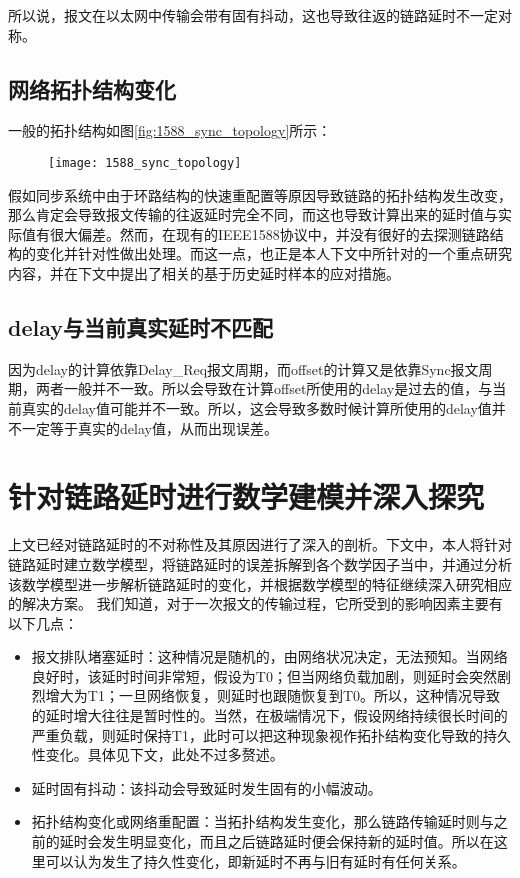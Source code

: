所以说，报文在以太网中传输会带有固有抖动，这也导致往返的链路延时不一定对称。

\subsection{网络拓扑结构变化}
一般的拓扑结构如图\ref{fig:1588_sync_topology}所示：

\begin{figure}[!hbp]
  \centering
  \begin{minipage}[b]{0.6\textwidth}
    \captionstyle{\centering}
    \centering
    \texttt{[image: 1588\_sync\_topology]}
  \end{minipage}     
\end{figure}

假如同步系统中由于环路结构的快速重配置等原因导致链路的拓扑结构发生改变，那么肯定会导致报文传输的往返延时完全不同，而这也导致计算出来的延时值与实际值有很大偏差。然而，在现有的IEEE1588协议中，并没有很好的去探测链路结构的变化并针对性做出处理。而这一点，也正是本人下文中所针对的一个重点研究内容，并在下文中提出了相关的基于历史延时样本的应对措施。

\subsection{delay与当前真实延时不匹配}
因为delay的计算依靠Delay\_Req报文周期，而offset的计算又是依靠Sync报文周期，两者一般并不一致。所以会导致在计算offset所使用的delay是过去的值，与当前真实的delay值可能并不一致。所以，这会导致多数时候计算所使用的delay值并不一定等于真实的delay值，从而出现误差。

\section{针对链路延时进行数学建模并深入探究}
上文已经对链路延时的不对称性及其原因进行了深入的剖析。下文中，本人将针对链路延时建立数学模型，将链路延时的误差拆解到各个数学因子当中，并通过分析该数学模型进一步解析链路延时的变化，并根据数学模型的特征继续深入研究相应的解决方案。
我们知道，对于一次报文的传输过程，它所受到的影响因素主要有以下几点：
\begin{itemize}[noitemsep,topsep=0pt,parsep=0pt,partopsep=0pt]
	\item 报文排队堵塞延时：这种情况是随机的，由网络状况决定，无法预知。当网络良好时，该延时时间非常短，假设为T0；但当网络负载加剧，则延时会突然剧烈增大为T1；一旦网络恢复，则延时也跟随恢复到T0。所以，这种情况导致的延时增大往往是暂时性的。当然，在极端情况下，假设网络持续很长时间的严重负载，则延时保持T1，此时可以把这种现象视作拓扑结构变化导致的持久性变化。具体见下文，此处不过多赘述。
	\item 延时固有抖动：该抖动会导致延时发生固有的小幅波动。
	\item 拓扑结构变化或网络重配置：当拓扑结构发生变化，那么链路传输延时则与之前的延时会发生明显变化，而且之后链路延时便会保持新的延时值。所以在这里可以认为发生了持久性变化，即新延时不再与旧有延时有任何关系。
\end{itemize}

